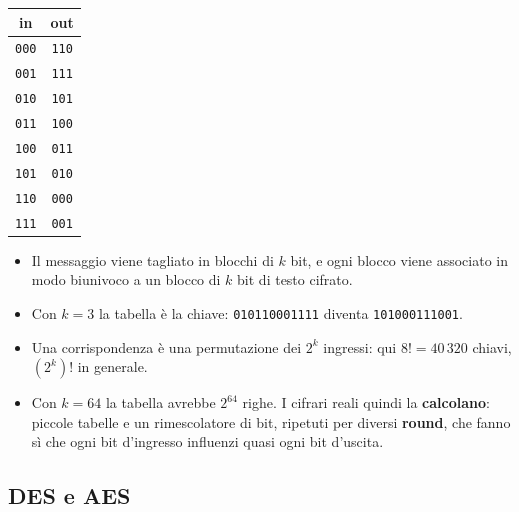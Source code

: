 \begin{minipage}{0.28\linewidth}
\centering
\begin{tabular}{cc}
\toprule
\textbf{in} & \textbf{out} \\
\midrule
\texttt{000} & \texttt{110} \\
\texttt{001} & \texttt{111} \\
\texttt{010} & \texttt{101} \\
\texttt{011} & \texttt{100} \\
\texttt{100} & \texttt{011} \\
\texttt{101} & \texttt{010} \\
\texttt{110} & \texttt{000} \\
\texttt{111} & \texttt{001} \\
\bottomrule
\end{tabular}
\end{minipage}\hfill
\begin{minipage}{0.68\linewidth}
\begin{itemize}
    \item Il messaggio viene tagliato in blocchi di $k$ bit, e ogni blocco viene associato in modo biunivoco a un blocco di $k$ bit di
          testo cifrato.
    \item Con $k = 3$ la tabella è la chiave: \texttt{010110001111} diventa \texttt{101000111001}.
    \item Una corrispondenza è una permutazione dei $2^k$ ingressi: qui $8! = 40\,320$ chiavi, $(2^k)!$ in generale.
    \item Con $k = 64$ la tabella avrebbe $2^{64}$ righe. I cifrari reali quindi la \textbf{calcolano}: piccole tabelle e un rimescolatore
          di bit, ripetuti per diversi \textbf{round}, che fanno sì che ogni bit d'ingresso influenzi quasi ogni bit d'uscita.
\end{itemize}
\end{minipage}


\subsection{DES e AES}


